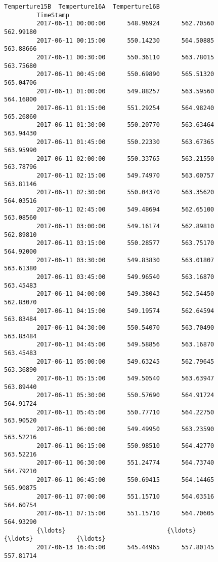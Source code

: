 \documentclass[11pt]{article}
\begin{document}
\begin{Verbatim}[commandchars=\\\{\}]
                              Temperture15B  Temperture16A  Temperture16B  
         TimeStamp                                                         
         2017-06-11 00:00:00      548.96924      562.70560      562.99180  
         2017-06-11 00:15:00      550.14230      564.50885      563.88666  
         2017-06-11 00:30:00      550.36110      563.78015      563.75680  
         2017-06-11 00:45:00      550.69890      565.51320      565.04706  
         2017-06-11 01:00:00      549.88257      563.59560      564.16800  
         2017-06-11 01:15:00      551.29254      564.98240      565.26860  
         2017-06-11 01:30:00      550.20770      563.63464      563.94430  
         2017-06-11 01:45:00      550.22330      563.67365      563.95990  
         2017-06-11 02:00:00      550.33765      563.21550      563.78796  
         2017-06-11 02:15:00      549.74970      563.00757      563.81146  
         2017-06-11 02:30:00      550.04370      563.35620      564.03516  
         2017-06-11 02:45:00      549.48694      562.65100      563.08560  
         2017-06-11 03:00:00      549.16174      562.89810      562.89810  
         2017-06-11 03:15:00      550.28577      563.75170      564.92000  
         2017-06-11 03:30:00      549.83830      563.01807      563.61380  
         2017-06-11 03:45:00      549.96540      563.16870      563.45483  
         2017-06-11 04:00:00      549.38043      562.54450      562.83070  
         2017-06-11 04:15:00      549.19574      562.64594      563.83484  
         2017-06-11 04:30:00      550.54070      563.70490      563.83484  
         2017-06-11 04:45:00      549.58856      563.16870      563.45483  
         2017-06-11 05:00:00      549.63245      562.79645      563.36890  
         2017-06-11 05:15:00      549.50540      563.63947      563.89440  
         2017-06-11 05:30:00      550.57690      564.91724      564.91724  
         2017-06-11 05:45:00      550.77710      564.22750      563.90520  
         2017-06-11 06:00:00      549.49950      563.23590      563.52216  
         2017-06-11 06:15:00      550.98510      564.42770      563.52216  
         2017-06-11 06:30:00      551.24774      564.73740      564.79210  
         2017-06-11 06:45:00      550.69415      564.14465      565.90875  
         2017-06-11 07:00:00      551.15710      564.03516      564.60754  
         2017-06-11 07:15:00      551.15710      564.70605      564.93290  
         {\ldots}                            {\ldots}            {\ldots}            {\ldots}  
         2017-06-13 16:45:00      545.44965      557.80145      557.81714  

\end{Verbatim}
\end{document}
